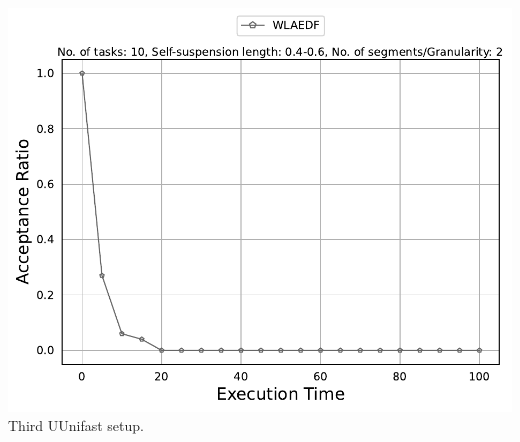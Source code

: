 \documentclass[]{article}
\begin{document}
\begin{minipage}[t]{0.48\linewidth}
		\includegraphics[width=\linewidth]{WLAEDF[2][0.4-0.6][10].pdf}
		Third UUnifast setup.
		\vspace{0.3cm}
		
		
	\end{minipage}\hfill
\end{document}
